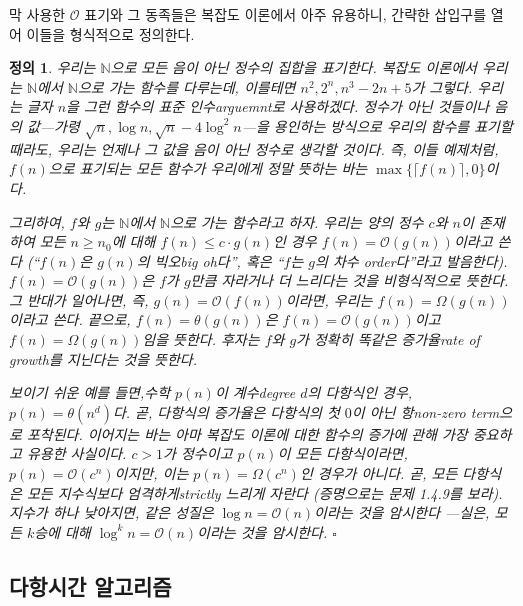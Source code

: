 \documentclass[a4paper,chapter,atbegshi,]{oblivoir}
\newtheorem{defn}{정의}[chapter]
\begin{document}
막 사용한 $\mathcal{O}$ 표기와 그 동족들은 복잡도 이론에서 아주 유용하니, 
간략한 삽입구를 열어 이들을 형식적으로 정의한다.

\begin{defn}\normalfont
  우리는 $\mathbb{N}$으로 모든 음이 아닌 정수의 집합을 표기한다. 복잡도
  이론에서 우리는 $\mathbb{N}$에서 $\mathbb{N}$으로 가는 함수를 다루는데,
  이를테면 $n^2,2^n,n^3-2n+5$가 그렇다. 우리는 글자 $n$을 그런 함수의 표준
  인수{\footnotesize arguemnt}로 사용하겠다. 정수가 아닌 것들이나 음의 
  값---가령 $\sqrt{n},\log n, \sqrt{n}-4\log^2n$---을 용인하는 방식으로 
  우리의 함수를 표기할 때라도, 우리는 언제나 그 값을 음이 아닌 정수로
  생각할 것이다. 즉, 이들 예제처럼, $f(n)$으로 표기되는 모든 함수가 
  우리에게 정말 뜻하는 바는 $\max\{\lceil f(n)\rceil,0\}$이다.

  그리하여, $f$와 $g$는 $\mathbb{N}$에서 $\mathbb{N}$으로 가는 함수라고 하자.
  우리는 양의 정수 $c$와 $n$이 존재하여 모든 $n\geq n_0$에 대해 $f(n)\leq c\cdot
  g(n)$인 경우 $f(n)=\mathcal{O}(g(n))$이라고 쓴다 (``$f(n)$은 $g(n)$의
  빅오{\footnotesize big oh}다'', 혹은 ``$f$는 $g$의 차수{\footnotesize 
  order}다''라고 발음한다). $f(n)=\mathcal{O}(g(n))$은 $f$가 $g$만큼
  자라거나 더 느리다는 것을 비형식적으로 뜻한다. 그 반대가 일어나면,
  즉, $g(n)=\mathcal{O}(f(n))$이라면, 우리는 $f(n)=\Omega(g(n))$이라고 쓴다.  
  끝으로, $f(n)=\theta(g(n))$은 $f(n)=\mathcal{O}(g(n))$이고 
  $f(n)=\Omega(g(n))$임을 뜻한다. 후자는 $f$와 $g$가 정확히 똑같은 
  \emph{증가율\footnotesize rate of growth}를 지닌다는 것을 뜻한다. 

  보이기 쉬운 예를 들면,수학 $p(n)$이 계수{\footnotesize degree} $d$의
  다항식인 경우, $p(n)=\theta(n^d)$다. 곧, 다항식의 증가율은 다항식의
  첫 $0$이 아닌 항{\footnotesize non-zero term}으로 포착된다. 이어지는 바는
  아마 복잡도 이론에 대한 함수의 증가에 관해 가장 중요하고 유용한 사실이다. 
  $c>1$가 정수이고 $p(n)$이 모든 다항식이라면, $p(n)=\mathcal{O}(c^n)$이지만, 
  이는 $p(n)=\Omega(c^n)$인 경우가 아니다. 곧, \emph{모든 다항식은 모든 지수식보다
  엄격하게{\footnotesize strictly} 느리게 자란다} (증명으로는 문제 1.4.9를 보라).
  지수가 하나 낮아지면, 같은 성질은 $\log n=\mathcal{O}(n)$이라는 것을 암시한다
  ---실은, 모든 $k$승에 대해 $\log^k n=\mathcal{O}(n)$이라는 것을 암시한다. 
  $\square$
\end{defn}

\subsection{다항시간 알고리즘}
\end{document}
